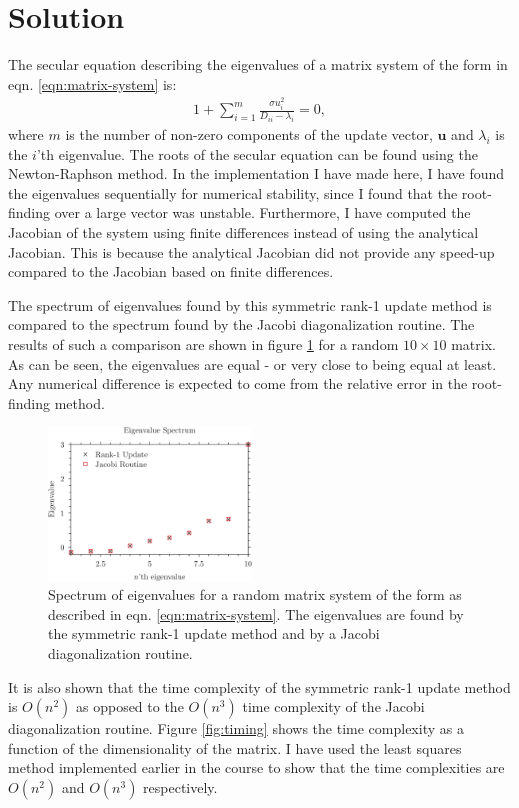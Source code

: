 \documentclass[twocolumn,a4paper, 10pts]{article}
\begin{document}
\section*{Solution}
The secular equation describing the eigenvalues of a matrix system of the form in eqn. \ref{eqn:matrix-system} is:
\begin{align}
1+\sum_{i=1}^m\frac{\sigma u_i^2}{D_{ii}-\lambda_i}=0,
\end{align}
where $m$ is the number of non-zero components of the update vector, $\mathbf{u}$ and $\lambda_i$ is the $i$'th eigenvalue. The roots of the secular equation can be found using the Newton-Raphson method. In the implementation I have made here, I have found the eigenvalues sequentially for numerical stability, since I found that the root-finding over a large vector was unstable. Furthermore, I have computed the Jacobian of the system using finite differences instead of using the analytical Jacobian. This is because the analytical Jacobian did not provide any speed-up compared to the Jacobian based on finite differences.
\par
The spectrum of eigenvalues found by this symmetric rank-1 update method is compared to the spectrum found by the Jacobi diagonalization routine. The results of such a comparison are shown in figure \ref{fig:spectrum} for a random $10\times 10$ matrix. As can be seen, the eigenvalues are equal - or very close to being equal at least. Any numerical difference is expected to come from the relative error in the root-finding method.
\begin{figure}[h]
    \includegraphics[width=0.48\textwidth]{img/eig_spectrum.png}
    \caption{Spectrum of eigenvalues for a random matrix system of the form as described in eqn. \ref{eqn:matrix-system}. The eigenvalues are found by the symmetric rank-1 update method and by a Jacobi diagonalization routine.}
    \label{fig:spectrum}
\end{figure}
\par
It is also shown that the time complexity of the symmetric rank-1 update method is $O(n^2)$ as opposed to the $O(n^3)$ time complexity of the Jacobi diagonalization routine. Figure \ref{fig:timing} shows the time complexity as a function of the dimensionality of the matrix. I have used the least squares method implemented earlier in the course to show that the time complexities are $O(n^2)$ and $O(n^3)$ respectively.
\end{document}
